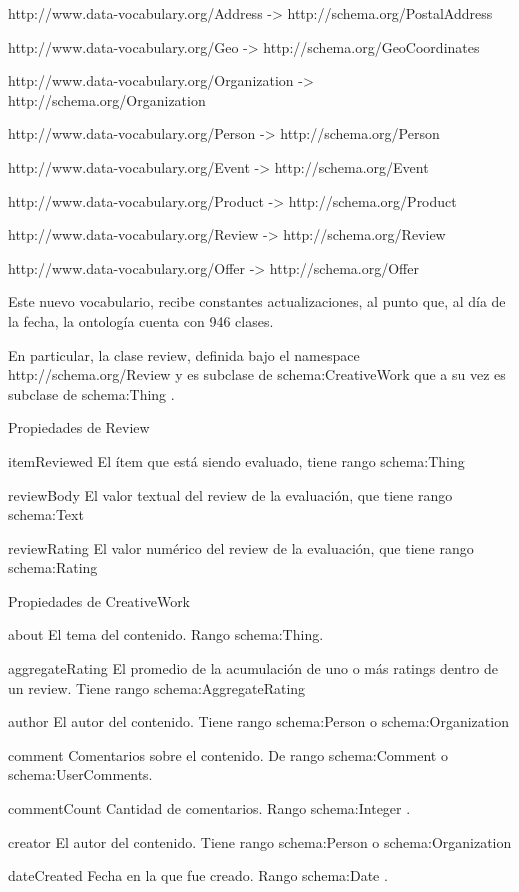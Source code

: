 http://www.data-vocabulary.org/Address -> http://schema.org/PostalAddress

http://www.data-vocabulary.org/Geo -> http://schema.org/GeoCoordinates

http://www.data-vocabulary.org/Organization -> http://schema.org/Organization

http://www.data-vocabulary.org/Person -> http://schema.org/Person

http://www.data-vocabulary.org/Event -> http://schema.org/Event

http://www.data-vocabulary.org/Product -> http://schema.org/Product

http://www.data-vocabulary.org/Review -> http://schema.org/Review

http://www.data-vocabulary.org/Offer -> http://schema.org/Offer

Este nuevo vocabulario, recibe constantes actualizaciones, al punto que, al día de la fecha, la ontología cuenta con 946 clases. 

En particular, la clase review, definida bajo el namespace http://schema.org/Review y es subclase de schema:CreativeWork 
que a su vez es subclase de schema:Thing .

Propiedades de Review

itemReviewed	El ítem que está siendo evaluado, tiene rango schema:Thing 

reviewBody 	El valor textual del review de la evaluación, que tiene rango schema:Text 

reviewRating 	El valor numérico del review de la evaluación, que tiene rango schema:Rating 


Propiedades de CreativeWork 

about 	El tema del contenido. Rango schema:Thing. 

aggregateRating 	El promedio de la acumulación de uno o más ratings dentro de un review. Tiene rango schema:AggregateRating 

author 	El autor del contenido. Tiene rango schema:Person o schema:Organization

comment 	Comentarios sobre el contenido. De rango schema:Comment o schema:UserComments.

commentCount 	Cantidad de comentarios. Rango schema:Integer . 

creator 	El autor del contenido. Tiene rango schema:Person o schema:Organization

dateCreated 	Fecha en la que fue creado. Rango schema:Date .

